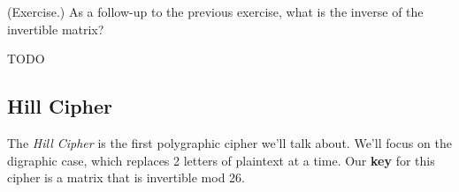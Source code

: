 \documentclass[letterpaper]{article}
\newcommand{\0}{\mathbf{0}}
\begin{document}
\begin{mdframed}
    (Exercise.) As a follow-up to the previous exercise, what is the inverse of the invertible matrix? 

    \begin{mdframed}
        TODO 
    \end{mdframed}
\end{mdframed}

\subsection{Hill Cipher}
The \emph{Hill Cipher} is the first polygraphic cipher we'll talk about. We'll focus on the digraphic case, which replaces 2 letters of plaintext at a time. Our \textbf{key} for this cipher is a matrix that is invertible mod 26. 
\end{document}
